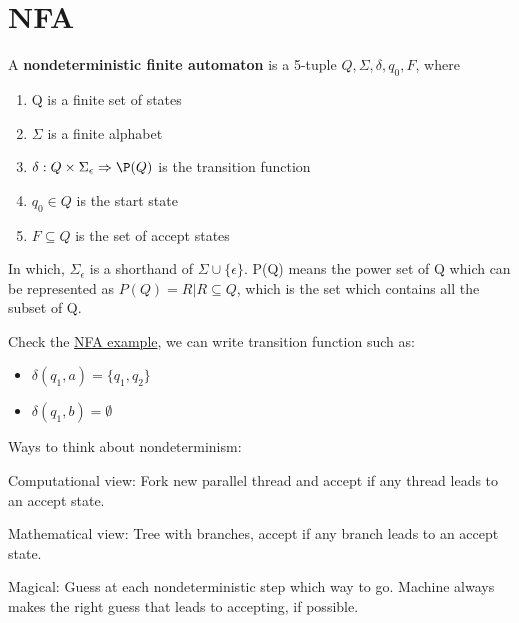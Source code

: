 \section{NFA}
\begin{definition}
    A \textbf{nondeterministic finite automaton} is a 5-tuple \(Q, \Sigma, \delta, q_0, F\), where
    \begin{enumerate}
        \item Q is a finite set of states
        \item \(\Sigma\) is a finite alphabet 
        \item \(\delta: Q \times \Sigma_{\epsilon} \Rightarrow \P(Q)\) is the transition function 
        \item \(q_0 \in Q\) is the start state
        \item \(F \subseteq Q\) is the set of accept states   
    \end{enumerate}  

    In which, \(\Sigma_{\epsilon}\) is a shorthand of \(\Sigma \cup \{ \epsilon \} \).  
    P(Q) means the power set of Q which can be represented as \(P(Q) = {R | R \subseteq Q}\), which is the set which contains all the subset of Q.  
\end{definition}

\begin{eg}
    Check the \hyperref[eg: NFA]{NFA example}, we can write transition function such as:
    
    \begin{itemize}
        \item \(\delta(q_1, a) = \{ q_1, q_2 \} \) 
        \item \(\delta(q_1, b) = \emptyset \) 
    \end{itemize}
\end{eg}

Ways to think about nondeterminism: 

Computational view: Fork new parallel thread and accept if any thread leads to an accept state.

Mathematical view: Tree with branches, accept if any branch leads to an accept state.

Magical: Guess at each nondeterministic step which way to go. Machine always makes the right guess that leads to accepting, if possible.

